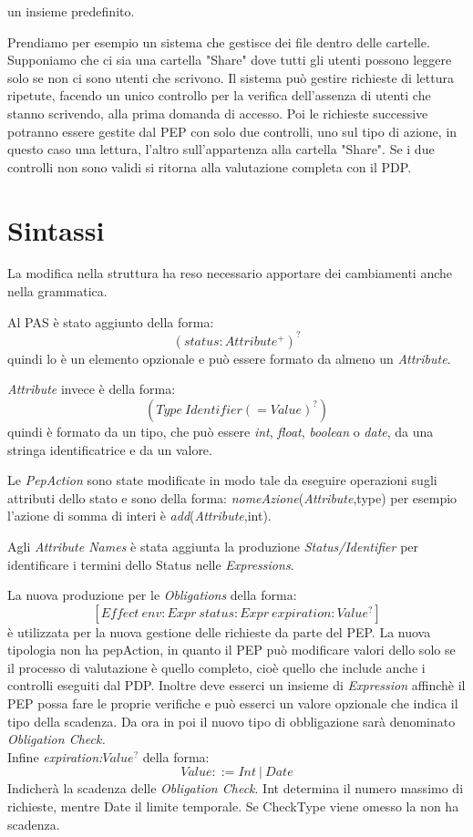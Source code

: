 un insieme predefinito.\par
Prendiamo per esempio un sistema che gestisce dei file dentro delle cartelle. Supponiamo che ci sia una cartella
"Share" dove tutti gli utenti possono leggere solo se non ci sono utenti che scrivono.
Il sistema può gestire richieste di lettura ripetute, facendo un unico controllo per la verifica dell'assenza di
utenti che stanno scrivendo, alla prima domanda di accesso. Poi le richieste successive potranno essere
gestite dal \ac{PEP} con solo due controlli, uno sul tipo di azione, in questo caso una lettura, l'altro sull'appartenza
alla cartella "Share". Se i due controlli non sono validi si ritorna alla valutazione completa con il \ac{PDP}.
\section{Sintassi}
\label{sec:SintassiNew}
La modifica nella struttura ha reso necessario apportare dei cambiamenti anche nella grammatica.\par
Al \ac{PAS} è stato aggiunto \status della forma:
$$(status: Attribute^+)^?$$
quindi lo \status è un elemento opzionale e può essere formato da almeno un \emph{ Attribute}.

\emph{ Attribute} invece è della forma:
$$(Type\ Identifier (= Value)^?)$$
quindi è formato da un tipo, che può essere \emph{int}, \emph{float}, \emph{boolean} o \emph{date}, da una stringa
identificatrice e da un valore.\par
Le \emph{PepAction} sono state modificate in modo tale da eseguire operazioni sugli attributi dello stato
e sono della forma: \emph{nomeAzione}(\emph{Attribute},type)
per esempio l'azione di somma di interi è \emph{add}(\emph{Attribute},int).\par
Agli \emph{Attribute Names} è stata aggiunta la produzione \textit{Status/Identifier} per identificare i
termini dello Status nelle \emph{Expressions}.\par
La nuova produzione per le \emph{Obligations} della forma:
$$[Effect\ env:Expr\  status:Expr \ expiration:Value^?]$$
è utilizzata per la nuova gestione delle richieste da parte del \ac{PEP}. La nuova tipologia
non ha pepAction, in quanto il \ac{PEP} può modificare valori dello \status solo se il processo di valutazione è quello
completo, cioè quello che include anche i controlli eseguiti dal \ac{PDP}. Inoltre deve esserci un insieme di \emph{Expression}
affinchè il \ac{PEP} possa fare le proprie verifiche e può esserci un valore opzionale che indica il tipo della scadenza.
Da ora in poi il nuovo tipo di obbligazione sarà denominato \emph{Obligation Check.}\\
Infine \emph{expiration:$Value^?$} della forma:
$$Value ::= Int\ |\ Date$$
Indicherà la scadenza delle \emph{Obligation Check}. Int determina il numero massimo di richieste, mentre Date
il limite temporale. Se CheckType viene omesso la \eobligation non ha scadenza.
{\label{Sintassi ausiliaria di FACPL Aggiornata}}
{\label{Sintassi di FACPL Aggiornata}}

